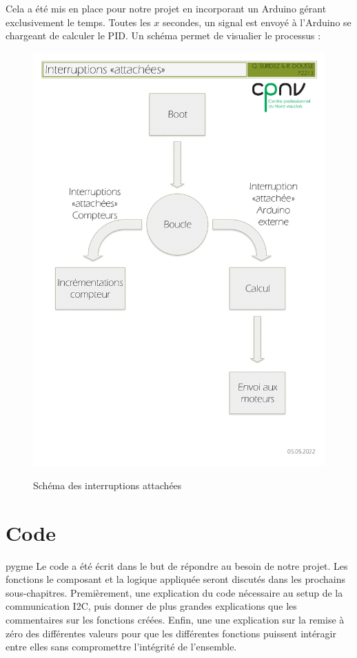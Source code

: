 \documentclass[
	a4paper,									%
	11pt,										%
	twoside,									%
	openright,									%
	notitlepage,									%
	parskip=half,								%
]{scrreprt}										%
\begin{document}
Cela a été mis en place pour notre projet en incorporant un Arduino gérant exclusivement le temps. Toutes les $x$ secondes, un signal est envoyé à l'Arduino se chargeant de calculer le PID. Un schéma permet de visualier 
le processus : 
\begin{figure}
	\centering
	\includegraphics[scale=0.2]{img/interruptions_attachees.jpg}
	\label{IntSch}
	\caption{Schéma des interruptions attachées}
\end{figure}

\chapter{Code}
pygme
Le code a été écrit dans le but de répondre au besoin de notre projet. Les fonctions le composant et la logique appliquée
seront discutés dans les prochains sous-chapitres. Premièrement, une explication du code nécessaire au setup de la
communication I2C, puis donner de plus grandes explications que les commentaires sur les fonctions créées. Enfin, une
une explication sur la remise à zéro des différentes valeurs pour que les différentes fonctions puissent intéragir entre
elles sans compromettre l'intégrité de l'ensemble.
\end{document}
